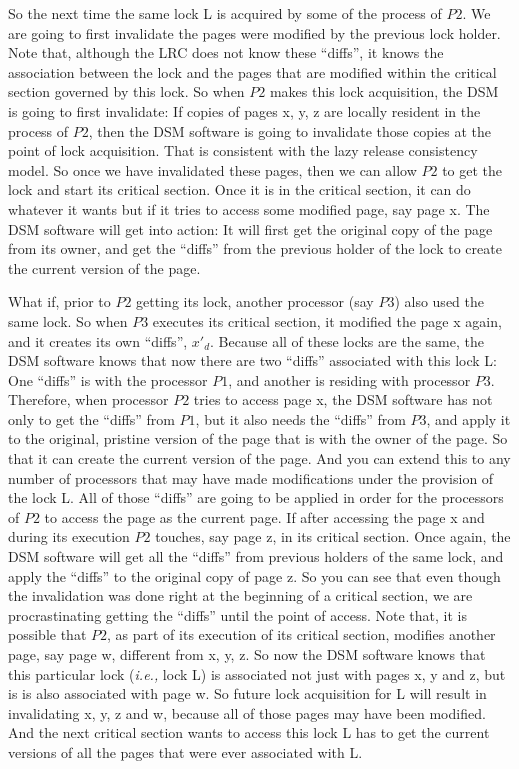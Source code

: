 \documentclass[11pt]{lecture}
\begin{document}
So the next time the same lock {\code L} is acquired by some of the process of $P2$. We are going to first invalidate 
the pages were modified by the previous lock holder. Note that, although the LRC does not know these ``diffs'', it 
knows the association between the lock and the pages that are modified within the critical section governed 
by this lock. So when $P2$ makes this lock acquisition, the DSM is going to first invalidate: If copies 
of pages {\code x, y, z} are locally resident in the process of $P2$, then the DSM software is 
going to invalidate those copies at the point of lock acquisition. That is consistent with the lazy 
release consistency model. So once we have invalidated these pages, then we can allow $P2$ to get the lock 
and start its critical section. Once it is in the critical section, it can do whatever it wants but if 
it tries to access some modified page, say page {\code x}. The DSM software will get into action: It will first 
get the original copy of the page from its owner, and get the ``diffs'' from the previous holder 
of the lock to create the current version of the page. 

What if, prior to $P2$ getting its lock, another processor (say $P3$) also used the same lock. 
So when $P3$ executes its critical section, it modified the page {\code x} again, and 
it creates its own ``diffs'', $x'_d$. Because all of these locks are the same, the DSM software 
knows that now there are two ``diffs'' associated with this lock {\code L}: One ``diffs'' is 
with the processor $P1$, and another is residing with processor $P3$. Therefore, when processor 
$P2$ tries to access page {\code x}, the DSM software has not only to get the ``diffs'' from 
$P1$, but it also needs the ``diffs'' from $P3$, and apply it to the original, pristine 
version of the page that is with the owner of the page. So that it can create the current version 
of the page. And you can extend this to any number of processors that may have made modifications 
under the provision of the lock {\code L}. All of those ``diffs'' are going to be applied in order for the 
processors of $P2$ to access the page as the current page. If after accessing the page {\code x} 
and during its execution $P2$ touches, say page {\code z}, in its critical section. Once again, the DSM software 
will get all the ``diffs'' from previous holders of the same lock, and apply the ``diffs'' to the 
original copy of page {\code z}. So you can see that even though the invalidation was done 
right at the beginning of a critical section, we are procrastinating getting the 
``diffs'' until the point of access. Note that, it is possible that $P2$, as part of its execution 
of its critical section, modifies another page, say page {\code w}, different from {\code x, y, z}. 
So now the DSM software knows that this particular lock ({\it i.e.,} lock {\code L}) is associated 
not just with pages {\code x, y} and {\code z}, but is is also associated with page {\code w}. So 
future lock acquisition for {\code L} will result in invalidating {\code x, y, z} and {\code w}, because 
all of those pages may have been modified. And the next critical section wants to access this lock {\code L} 
has to get the current versions of all the pages that were ever associated with {\code L}. 
\end{document}
